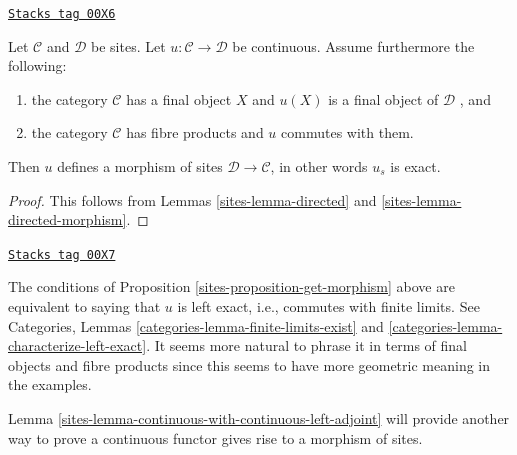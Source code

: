 \begin{proposition}
\label{sites-proposition-get-morphism}
\href{https://stacks.math.columbia.edu/tag/00X6}{\texttt{Stacks tag 00X6}}

Let $\mathcal{C}$ and $\mathcal{D}$ be sites. Let
$u : \mathcal{C} \to \mathcal{D}$ be continuous.
Assume furthermore the following:
\begin{enumerate}
\item the category $\mathcal{C}$ has a final object $X$ and
$u(X)$ is a final object of $\mathcal{D}$ , and
\item the category $\mathcal{C}$ has fibre products and
$u$ commutes with them.
\end{enumerate}
Then $u$ defines a morphism of sites $\mathcal{D} \to
\mathcal{C}$, in other words $u_s$ is exact.
\end{proposition}

\begin{proof}

This follows from Lemmas \ref{sites-lemma-directed} and
\ref{sites-lemma-directed-morphism}.
\end{proof}

\begin{remark}
\label{sites-remark-explain-left-exact}
\href{https://stacks.math.columbia.edu/tag/00X7}{\texttt{Stacks tag 00X7}}

The conditions of Proposition \ref{sites-proposition-get-morphism} above
are equivalent to saying that $u$ is left exact, i.e., commutes
with finite limits. See
Categories, Lemmas
\ref{categories-lemma-finite-limits-exist} and
\ref{categories-lemma-characterize-left-exact}.
It seems more natural to phrase it in terms of final objects
and fibre products since this seems to have more geometric meaning
in the examples.
\end{remark}

Lemma \ref{sites-lemma-continuous-with-continuous-left-adjoint} will
provide another way to prove a continuous functor
gives rise to a morphism of sites.

